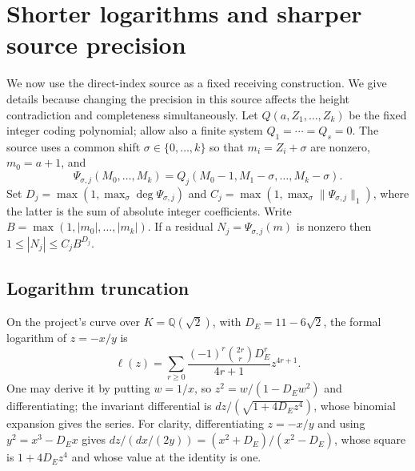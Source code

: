 \documentclass[11pt]{article}
\newcommand{\Q}{\mathbb Q}\newcommand{\Z}{\mathbb Z}\newcommand{\N}{\mathbb N}
\begin{document}
\section{Shorter logarithms and sharper source precision}\label{sec:precision}
We now use the direct-index source \cite{index} as a fixed receiving
construction. We give details because changing the precision in this
source affects the height contradiction and completeness simultaneously.
Let $Q(a,Z_1,\ldots,Z_k)$ be the fixed integer coding polynomial;
allow also a finite system $Q_1=\cdots=Q_s=0$. The source uses a common
shift $\sigma\in\{0,\ldots,k\}$ so that $m_i=Z_i+\sigma$ are nonzero,
$m_0=a+1$, and
\[
 \Psi_{\sigma,j}(M_0,\ldots,M_k)=Q_j(M_0-1,M_1-\sigma,\ldots,M_k-\sigma).
\]
Set $D_j=\max(1,\max_\sigma\deg\Psi_{\sigma,j})$ and
$C_j=\max(1,\max_\sigma\|\Psi_{\sigma,j}\|_1)$, where the latter is
the sum of absolute integer coefficients. Write
$B=\max(1,|m_0|,\ldots,|m_k|)$. If a residual $N_j=\Psi_{\sigma,j}(m)$
is nonzero then $1\le|N_j|\le C_j B^{D_j}$.

\subsection{Logarithm truncation}
On the project's curve over $K=\Q(\sqrt2)$, with $D_E=11-6\sqrt2$,
the formal logarithm of $z=-x/y$ is \cite{index,ellheight}
\[
 \ell(z)=\sum_{r\ge0}\frac{(-1)^r\binom{2r}{r}D_E^r}{4r+1}z^{4r+1}.
\]
One may derive it by putting $w=1/x$, so $z^2=w/(1-D_Ew^2)$
and differentiating; the invariant differential is
$dz/(\sqrt{1+4D_Ez^4})$, whose binomial expansion gives the series.
For clarity, differentiating $z=-x/y$ and using $y^2=x^3-D_Ex$
gives $dz/(dx/(2y))=(x^2+D_E)/(x^2-D_E)$, whose square is
$1+4D_Ez^4$ and whose value at the identity is one.
\end{document}
